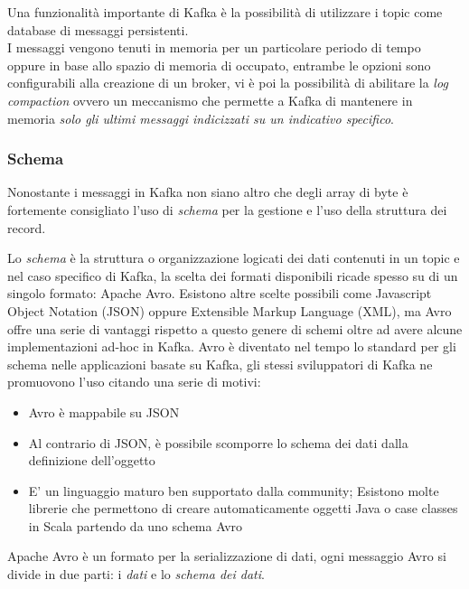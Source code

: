 \documentclass[]{article}
\providecommand{\tightlist}{%
  \setlength{\itemsep}{0pt}\setlength{\parskip}{0pt}}
\begin{document}
\newpage

Una funzionalità importante di Kafka è la possibilità di utilizzare i
topic come database di messaggi persistenti.\\
I messaggi vengono tenuti in memoria per un particolare periodo di tempo
oppure in base allo spazio di memoria di occupato, entrambe le opzioni
sono configurabili alla creazione di un broker, vi è poi la possibilità
di abilitare la \emph{log compaction} ovvero un meccanismo che permette
a Kafka di mantenere in memoria \emph{solo gli ultimi messaggi
indicizzati su un indicativo specifico}.

\newpage

\subsubsection{Schema}\label{schema}

Nonostante i messaggi in Kafka non siano altro che degli array di byte è
fortemente consigliato l'uso di \emph{schema} per la gestione e l'uso
della struttura dei record.

Lo \emph{schema} è la struttura o organizzazione logicati dei dati
contenuti in un topic e nel caso specifico di Kafka, la scelta dei
formati disponibili ricade spesso su di un singolo formato: Apache Avro.
Esistono altre scelte possibili come Javascript Object Notation (JSON)
oppure Extensible Markup Language (XML), ma Avro offre una serie di
vantaggi rispetto a questo genere di schemi oltre ad avere alcune
implementazioni ad-hoc in Kafka. Avro è diventato nel tempo lo standard
per gli schema nelle applicazioni basate su Kafka, gli stessi
sviluppatori di Kafka ne promuovono l'uso citando una serie di motivi:

\begin{itemize}
\tightlist
\item
  Avro è mappabile su JSON
\item
  Al contrario di JSON, è possibile scomporre lo schema dei dati dalla
  definizione dell'oggetto
\item
  E' un linguaggio maturo ben supportato dalla community; Esistono molte
  librerie che permettono di creare automaticamente oggetti Java o case
  classes in Scala partendo da uno schema Avro
\end{itemize}

Apache Avro è un formato per la serializzazione di dati, ogni messaggio
Avro si divide in due parti: i \emph{dati} e lo \emph{schema dei dati}.
\end{document}
